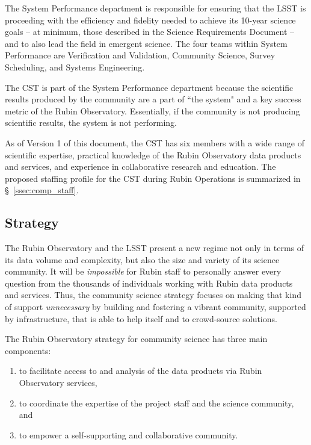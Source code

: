 \documentclass[DM,authoryear,toc]{lsstdoc}
\begin{document}
The System Performance department is responsible for ensuring that the LSST is proceeding with the efficiency and fidelity needed to achieve its 10-year science goals -- at minimum, those described in the Science Requirements Document  -- and to also lead the field in emergent science.
The four teams within System Performance are Verification and Validation, Community Science, Survey Scheduling, and Systems Engineering.

The CST is part of the System Performance department because the scientific results produced by the community are a part of ``the system" and a key success metric of the Rubin Observatory.
Essentially, if the community is not producing scientific results, the system is not performing. 

As of Version 1 of this document, the CST has six members with a wide range of scientific expertise, practical knowledge of the Rubin Observatory data products and services, and experience in collaborative research and education.
The proposed staffing profile for the CST during Rubin Operations is summarized in \S~\ref{ssec:comp_staff}.


\subsection{Strategy}\label{ssec:intro_strat}

The Rubin Observatory and the LSST present a new regime not only in terms of its data volume and complexity, but also the size and variety of its science community.
It will be \textit{impossible} for Rubin staff to personally answer every question from the thousands of individuals working with Rubin data products and services.
Thus, the community science strategy focuses on making that kind of support \textit{unnecessary} by building and fostering a vibrant community, supported by infrastructure, that is able to help itself and to crowd-source solutions. 

The Rubin Observatory strategy for community science has three main components:
\begin{enumerate}
\item to facilitate access to and analysis of the data products via Rubin Observatory services,
\item to coordinate the expertise of the project staff and the science community, and
\item to empower a self-supporting and collaborative community.
\end{enumerate}
\end{document}
